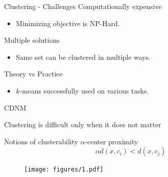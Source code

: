 \documentclass{beamer}
\newcommand{\mc}{\mathcal}
\begin{document}
\begin{frame}{Clustering - Challenges}  
  Computationally expensive\\
  \begin{itemize}
  	\item Minimizing objective is NP-Hard.
  \end{itemize}
  \vspace{0.1in}Multiple solutions
  \begin{itemize}
  	\item Same set can be clustered in multiple ways.
  \end{itemize}
  \vspace{0.1in}Theory vs Practice
  \begin{itemize}
	\item $k$-means successfully used on various tasks.
  \end{itemize}
  
\end{frame}

\begin{frame}{CDNM}
  
  \begin{center}Clustering is difficult only when it does not matter
  \end{center}
\end{frame}

\begin{frame}{Notions of clusterability}
   $\alpha$-center proximity\\
   $$\alpha d(x, c_i) < d(x, c_j)$$ 
   \begin{figure}
	  \texttt{[image: figures/1.pdf]}
   \end{figure}
   
\end{frame}

\end{document}
